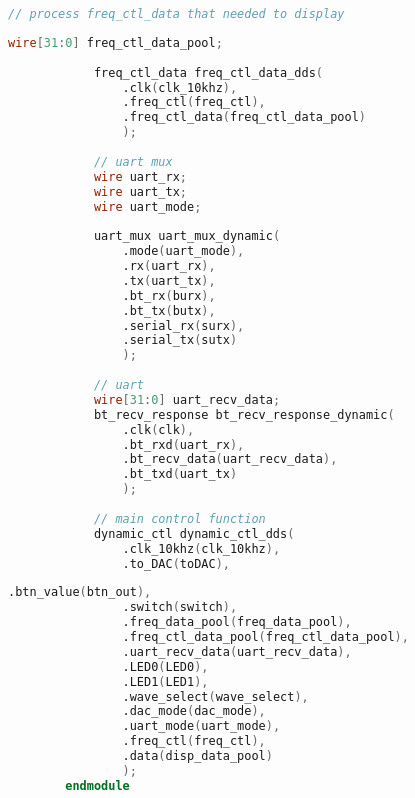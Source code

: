 {\begin{spacing}{1.5}
\begin{lstlisting}[language=Verilog]
			// process freq_ctl_data that needed to display
		\end{lstlisting}
		\begin{lstlisting}[language=Verilog]
			wire[31:0] freq_ctl_data_pool;
		
			freq_ctl_data freq_ctl_data_dds(
				.clk(clk_10khz),
				.freq_ctl(freq_ctl),
				.freq_ctl_data(freq_ctl_data_pool)
				);
		
			// uart mux
			wire uart_rx;
			wire uart_tx;
			wire uart_mode;
		
			uart_mux uart_mux_dynamic(
				.mode(uart_mode),
				.rx(uart_rx),
				.tx(uart_tx),
				.bt_rx(burx),
				.bt_tx(butx),
				.serial_rx(surx),
				.serial_tx(sutx)
				);
			
			// uart
			wire[31:0] uart_recv_data;
			bt_recv_response bt_recv_response_dynamic(
				.clk(clk),
				.bt_rxd(uart_rx),
				.bt_recv_data(uart_recv_data),
				.bt_txd(uart_tx)
				);
		
			// main control function
			dynamic_ctl dynamic_ctl_dds(
				.clk_10khz(clk_10khz),
				.to_DAC(toDAC),
		\end{lstlisting}
		\begin{lstlisting}[language=Verilog]
				.btn_value(btn_out),
				.switch(switch),
				.freq_data_pool(freq_data_pool),
				.freq_ctl_data_pool(freq_ctl_data_pool),
				.uart_recv_data(uart_recv_data),
				.LED0(LED0),
				.LED1(LED1),
				.wave_select(wave_select),
				.dac_mode(dac_mode),
				.uart_mode(uart_mode),
				.freq_ctl(freq_ctl),
				.data(disp_data_pool)
				);
		endmodule
		\end{lstlisting}
\end{spacing}}